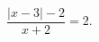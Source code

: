 \begin{ex}[type=equation]
	\begin{condition}
		$\dfrac{\big | x -3\big| - 2}{x + 2} = 2.$
	\end{condition}
\end{ex}